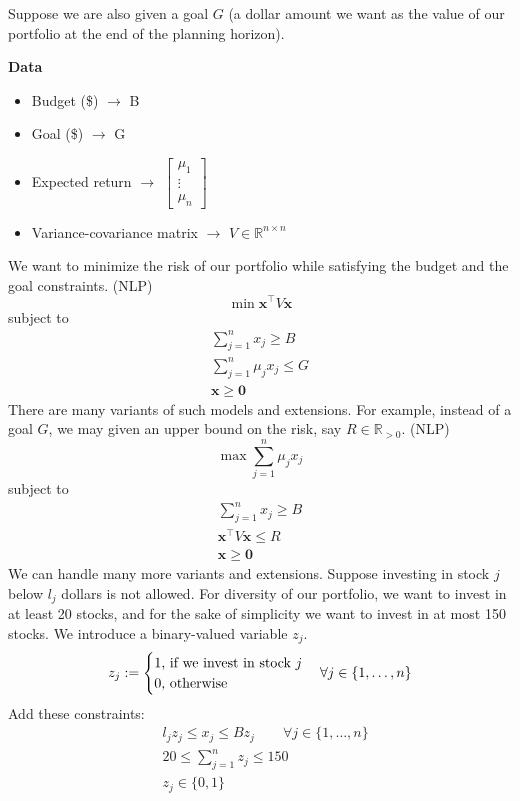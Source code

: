 Suppose we are also given a goal $G$ (a dollar amount we want as the value
of our portfolio at the end of the planning horizon).

\textbf{Data}
\begin{itemize}
    \item Budget (\$) $\rightarrow$ B
    \item Goal (\$) $\rightarrow$ G
    \item Expected return $\rightarrow$
    $\begin{bmatrix}
        \mu_1\\
        \vdots\\
        \mu_n
    \end{bmatrix}$
    \item Variance-covariance matrix $\rightarrow$ 
    $V\in \mathbb{R}^{n\times n}$
\end{itemize}
We want to minimize the risk of our portfolio while satisfying the budget and
the goal constraints. (NLP)
\[\min \bm{x}^\top  V\bm{x}\]
subject to
\begin{align*}
    \sum_{j = 1}^{n}x_j\ge B\\
    \sum_{j = 1}^{n}\mu_jx_j\le G\\
    \bm{x}\ge \bm{0}
\end{align*}
There are many variants of such models and extensions. For example, instead
of a goal $G$, we may given an upper bound on the risk, say 
$R\in\mathbb{R}_{>0}$. (NLP)
\[\max \sum_{j = 1}^{n}\mu_jx_j\]
subject to
\begin{align*}
    \sum_{j = 1}^{n}x_j\ge B\\
    \bm{x}^\top  V\bm{x}\le R\\
    \bm{x}\ge \bm{0}
\end{align*}
We can handle many more variants and extensions. Suppose investing in stock
$j$ below $l_j$ dollars is not allowed. For diversity of our portfolio, we
want to invest in at least 20 stocks, and for the sake of simplicity we want
to invest in at most 150 stocks. We introduce a binary-valued variable $z_j$.
\[z_j:=
\begin{cases}
    1 \text{, if we invest in stock $j$}\\
    0 \text{, otherwise}
\end{cases}
\forall j\in\{1,\dots,n\}\\
\]
Add these constraints:
\begin{align*}
    &l_jz_j\le x_j\le Bz_j\qquad \forall j\in\{1,\dots,n\}\\
    &20\le \sum_{j = 1}^{n}z_j\le 150\\
    &z_j\in\{0,1\}
\end{align*}